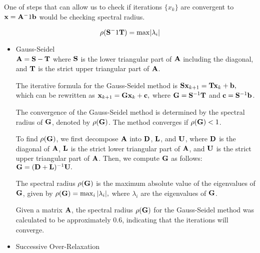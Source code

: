 
One of steps that can allow us to check if iterations $\{x_k\}$ are convergent to $\mathbf{x} = \mathbf{A}^-1\mathbf{b}$ would be checking spectral radius.

\begin{equation*}
  \rho(\mathbf{S}^-1\mathbf{T}) = \max \lvert\lambda_i\rvert
\end{equation*}
\begin{itemize}
  \item Gauss-Seidel\\
    
    $ \mathbf{A} = \mathbf{S} - \mathbf{T} $
    where $ \mathbf{S} $ is the lower triangular part of $ \mathbf{A} $ including the diagonal, and $ \mathbf{T} $ is the strict upper triangular part of $ \mathbf{A} $.

    The iterative formula for the Gauss-Seidel method is
    $ \mathbf{Sx}_{k+1} = \mathbf{Tx}_k + \mathbf{b}, $
    which can be rewritten as
    $ \mathbf{x}_{k+1} = \mathbf{Gx}_k + \mathbf{c}, $
    where $ \mathbf{G} = \mathbf{S}^{-1}\mathbf{T} $ and $ \mathbf{c} = \mathbf{S}^{-1}\mathbf{b} $.

    The convergence of the Gauss-Seidel method is determined by the spectral radius of $ \mathbf{G} $, denoted by $ \rho(\mathbf{G}) $. The method converges if $ \rho(\mathbf{G}) < 1 $.

    To find $ \rho(\mathbf{G}) $, we first decompose $ \mathbf{A} $ into $ \mathbf{D} $, $ \mathbf{L} $, and $ \mathbf{U} $, where $ \mathbf{D} $ is the diagonal of $ \mathbf{A} $, $ \mathbf{L} $ is the strict lower triangular part of $ \mathbf{A} $, and $ \mathbf{U} $ is the strict upper triangular part of $ \mathbf{A} $. Then, we compute $ \mathbf{G} $ as follows:
    $ \mathbf{G} = (\mathbf{D} + \mathbf{L})^{-1}\mathbf{U}. $

    The spectral radius $ \rho(\mathbf{G}) $ is the maximum absolute value of the eigenvalues of $ \mathbf{G} $, given by
    $ \rho(\mathbf{G}) = \max_i |\lambda_i|, $
    where $ \lambda_i $ are the eigenvalues of $ \mathbf{G} $.

    Given a matrix $ \mathbf{A} $, the spectral radius $ \rho(\mathbf{G}) $ for the Gauss-Seidel method was calculated to be approximately 0.6, indicating that the iterations will converge.
      
  \item Successive Over-Relaxation \\


\end{itemize}

